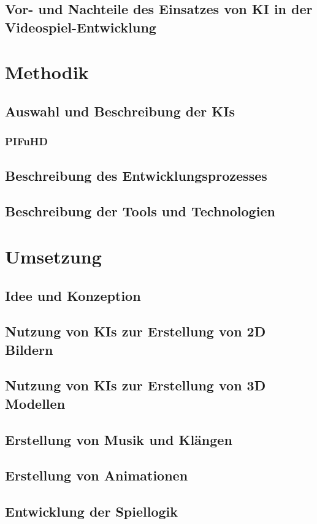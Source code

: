 \documentclass[12pt,a4paper,bibliography=totocnumbered,listof=totocnumbered]{scrartcl}
\begin{document}
\subsection{Vor- und Nachteile des Einsatzes von KI in der Videospiel-Entwicklung}

\section{Methodik}
\subsection{Auswahl und Beschreibung der KIs}
\subsubsection{PIFuHD}
\subsection{Beschreibung des Entwicklungsprozesses}
\subsection{Beschreibung der Tools und Technologien}

\section{Umsetzung}
\subsection {Idee und Konzeption}
\subsection{Nutzung von KIs zur Erstellung von 2D Bildern}
\subsection{Nutzung von KIs zur Erstellung von 3D Modellen}
\subsection{Erstellung von Musik und Klängen}
\subsection{Erstellung von Animationen}
\subsection{Entwicklung der Spiellogik}
\end{document}
